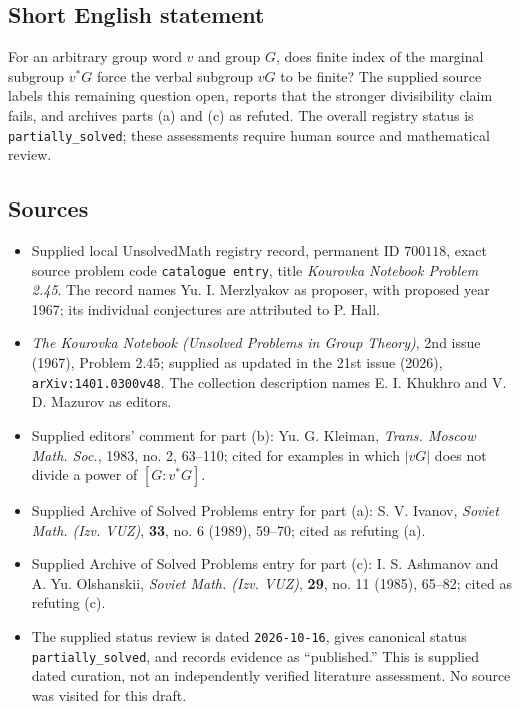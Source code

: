 \documentclass[11pt]{article}
\begin{document}
\subsection{Short English statement}
For an arbitrary group word \(v\) and group \(G\), does finite index of the marginal subgroup \(v^*G\) force the verbal subgroup \(vG\) to be finite? The supplied source labels this remaining question open, reports that the stronger divisibility claim fails, and archives parts (a) and (c) as refuted. The overall registry status is \texttt{partially\_solved}; these assessments require human source and mathematical review.
\subsection{Sources}
\begin{itemize}
\item Supplied local UnsolvedMath registry record, permanent ID \(700118\), exact source problem code \texttt{catalogue entry}, title \emph{Kourovka Notebook Problem 2.45}. The record names Yu. I. Merzlyakov as proposer, with proposed year 1967; its individual conjectures are attributed to P. Hall.
\item \emph{The Kourovka Notebook (Unsolved Problems in Group Theory)}, 2nd issue (1967), Problem 2.45; supplied as updated in the 21st issue (2026), \texttt{arXiv:1401.0300v48}. The collection description names E. I. Khukhro and V. D. Mazurov as editors.
\item Supplied editors' comment for part (b): Yu. G. Kleiman, \emph{Trans. Moscow Math. Soc.}, 1983, no. 2, 63--110; cited for examples in which \(|vG|\) does not divide a power of \([G:v^*G]\).
\item Supplied Archive of Solved Problems entry for part (a): S. V. Ivanov, \emph{Soviet Math. (Izv. VUZ)}, \textbf{33}, no. 6 (1989), 59--70; cited as refuting (a).
\item Supplied Archive of Solved Problems entry for part (c): I. S. Ashmanov and A. Yu. Olshanskii, \emph{Soviet Math. (Izv. VUZ)}, \textbf{29}, no. 11 (1985), 65--82; cited as refuting (c).
\item The supplied status review is dated \texttt{2026-10-16}, gives canonical status \texttt{partially\_solved}, and records evidence as ``published.'' This is supplied dated curation, not an independently verified literature assessment. No source was visited for this draft.
\end{itemize}
\end{document}
